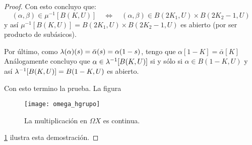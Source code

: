 \begin{proof}
Con esto concluyo que:
\[
	(\alpha,\beta)\in\mu^{-1}[B(K,U)] \quad\iff\quad (\alpha,\beta)\in B(2K_1,U)\times B(2K_2-1,U)
\]
y as\'i $\mu^{-1}[B(K,U)]=B(2K_1,U)\times B(2K_2-1,U)$ es abierto (por ser producto de sub\'asicos).

Por \'ultimo, como $\lambda(\alpha)(s)=\bar{\alpha}(s)=\alpha(1-s)$, tengo que $\alpha[1-K]=\bar{\alpha}[K]$
An\'alogamente concluyo que $\alpha\in\lambda^{-1}[B(K,U)]$ si y s\'olo si $\alpha\in B(1-K,U)$ y as\'i
$\lambda^{-1}[B(K,U)]=B(1-K,U)$ es abierto.

Con esto termino la prueba. La figura%
\begin{figure}
  \centering
  \texttt{[image: omega\_hgrupo]}
  \caption{La multiplicaci\'on en $\Omega X$ es continua.}
  \label{fig:omega_hgrupo}
\end{figure}
\ref{fig:omega_hgrupo} ilustra esta demostraci\'on.


\end{proof}%

